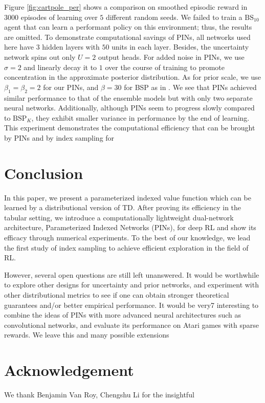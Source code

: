\documentclass[letterpaper]{article} %
\theoremstyle{definition}
\begin{document}
Figure \ref{fig:cartpole_per} shows a comparison on smoothed episodic reward in $3000$ episodes of learning over $5$ different random seeds. We failed to train a $\mathrm{BS}_{10}$ agent that can learn a performant policy on this environment; thus, the results are omitted. To demonstrate computational savings of PINs, all networks used here have $3$ hidden layers with $50$ units in each layer. Besides, the uncertainty network spins out only $U=2$ output heads. For added noise in PINs, we use $\sigma=2$ and linearly decay it to $1$ over the course of training to promote concentration in the approximate posterior distribution. As for prior scale, we use $\beta_1=\beta_2=2$ for our PINs, and $\beta=30$ for BSP as in \cite{osband2018randomized}. We see that PINs achieved similar performance to that of the ensemble models but with only two separate neural networks. Additionally, although PINs seem to progress slowly compared to $\mathrm{BSP}_K$, they exhibit smaller variance in performance by the end of learning. This experiment demonstrates the computational efficiency that can be brought by PINs and by index sampling for

\vspace{-2.67mm}
\section{Conclusion}

In this paper, we present a parameterized indexed value function which can be learned by a distributional version of TD. After proving its efficiency in the tabular setting, we introduce a computationally lightweight dual-network architecture, Parameterized Indexed Networks (PINs), for deep RL and show its efficacy through numerical experiments. To the best of our knowledge, we lead the first study of index sampling to achieve efficient exploration in the field of RL.

However, several open questions are still left unanswered. It would be worthwhile to explore other designs for uncertainty and prior networks, and experiment with other distributional metrics to see if one can obtain stronger theoretical guarantees and/or better empirical performance. It would be very7 interesting to combine the ideas of PINs with more advanced neural architectures such as convolutional networks, and evaluate its performance on Atari games with sparse rewards. We leave this and many possible extensions

\vspace{-1.62mm}
\section{Acknowledgement}
We thank Benjamin Van Roy, Chengshu Li for the insightful

\medskip

\clearpage


\end{document}
